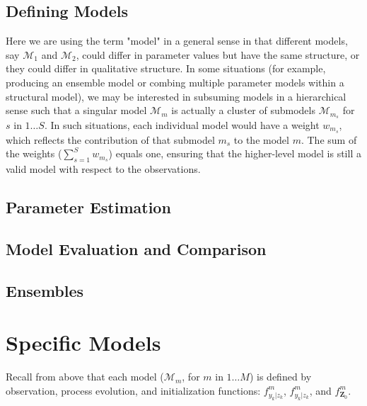 \documentclass{article}
\begin{document}
\subsection{Defining Models}
\label{subsec:devmods_md}

Here we are using the term "model" in a general sense in that different models, say $\mathcal{M}_1$ and $\mathcal{M}_2$, could differ in parameter values but have the same structure, or they could differ in qualitative structure. In some situations (for example, producing an ensemble model or combing multiple parameter models within a structural model), we may be interested in subsuming models in a hierarchical sense such that a singular model $\mathcal{M}_m$ is actually a cluster of submodels $\mathcal{M}_{m_s}$ for $s$ in $1 \ldots S$. In such situations, each individual model would have a weight $w_{m_s}$, which reflects the contribution of that submodel $m_s$ to the model $m$. The sum of the weights ($\sum_{s = 1}^{S}{w_{m_s}}$) equals one, ensuring that the higher-level model is still a valid model with respect to the observations.

\subsection{Parameter Estimation}
\label{subsec:devmods_pe}

\subsection{Model Evaluation and Comparison}
\label{subsec:devmods_mec}

\subsection{Ensembles}
\label{subsec:devmods_ens}

\section{Specific Models}
\label{sec:mods}

Recall from above that each model ($\mathcal{M}_m$, for $m$ in $1 \ldots M$) is defined by observation, process evolution, and initialization functions: $f^m_{y_k|z_k}$, $f^m_{y_k|z_k}$, and $f^m_{\textbf{Z}_0}$. 

  
\end{document}
